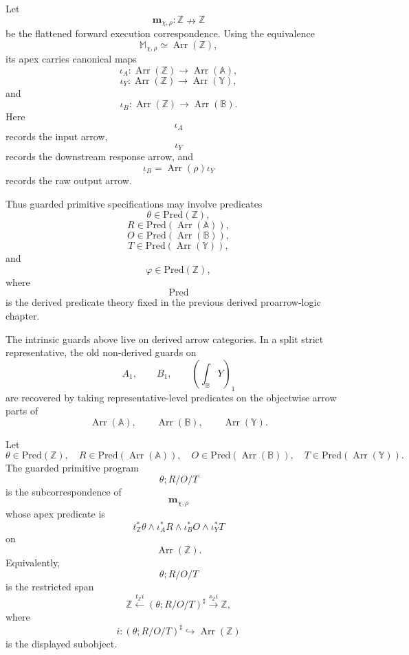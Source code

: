 Let
\[
\mathbf m_{\chi,\rho}:\mathbb Z\nrightarrow\mathbb Z
\]
be the flattened forward execution correspondence.  Using the equivalence
\[
\mathbb M_{\chi,\rho}
\simeq
\operatorname{Arr}(\mathbb Z),
\]
its apex carries canonical maps
\[
\iota_A:
\operatorname{Arr}(\mathbb Z)\to\operatorname{Arr}(\mathbb A),
\]
\[
\iota_Y:
\operatorname{Arr}(\mathbb Z)\to\operatorname{Arr}(\mathbb Y),
\]
and
\[
\iota_B:
\operatorname{Arr}(\mathbb Z)\to\operatorname{Arr}(\mathbb B).
\]
Here
\[
\iota_A
\]
records the input arrow,
\[
\iota_Y
\]
records the downstream response arrow, and
\[
\iota_B
=
\operatorname{Arr}(\rho)\iota_Y
\]
records the raw output arrow.

Thus guarded primitive specifications may involve predicates
\[
\theta\in\mathrm{Pred}(\mathbb Z),
\]
\[
R\in\mathrm{Pred}(\operatorname{Arr}(\mathbb A)),
\]
\[
O\in\mathrm{Pred}(\operatorname{Arr}(\mathbb B)),
\]
\[
T\in\mathrm{Pred}(\operatorname{Arr}(\mathbb Y)),
\]
and
\[
\varphi\in\mathrm{Pred}(\mathbb Z),
\]
where
\[
\mathrm{Pred}
\]
is the derived predicate theory fixed in the previous derived proarrow-logic
chapter.

\begin{remark}
\label{rem:derived-poly-strict-guard-predicates}
The intrinsic guards above live on derived arrow categories.  In a split strict
representative, the old non-derived guards on
\[
A_1,
\qquad
B_1,
\qquad
(\int_{\mathbb B}Y)_1
\]
are recovered by taking representative-level predicates on the objectwise
arrow parts of
\[
\operatorname{Arr}(\mathbb A),
\qquad
\operatorname{Arr}(\mathbb B),
\qquad
\operatorname{Arr}(\mathbb Y).
\]
\end{remark}

\begin{definition}
\label{def:derived-poly-guarded-primitive}
Let
\[
\theta\in\mathrm{Pred}(\mathbb Z),
\quad
R\in\mathrm{Pred}(\operatorname{Arr}(\mathbb A)),
\quad
O\in\mathrm{Pred}(\operatorname{Arr}(\mathbb B)),
\quad
T\in\mathrm{Pred}(\operatorname{Arr}(\mathbb Y)).
\]
The guarded primitive program
\[
\theta;R/O/T
\]
is the subcorrespondence of
\[
\mathbf m_{\chi,\rho}
\]
whose apex predicate is
\[
t_{\mathbb Z}^{\ast}\theta
\wedge
\iota_A^\ast R
\wedge
\iota_B^\ast O
\wedge
\iota_Y^\ast T
\]
on
\[
\operatorname{Arr}(\mathbb Z).
\]
Equivalently,
\[
\theta;R/O/T
\]
is the restricted span
\[
\mathbb Z
\xleftarrow{t_{\mathbb Z}i}
(\theta;R/O/T)^\sharp
\xrightarrow{s_{\mathbb Z}i}
\mathbb Z,
\]
where
\[
i:(\theta;R/O/T)^\sharp\hookrightarrow\operatorname{Arr}(\mathbb Z)
\]
is the displayed subobject.
\end{definition}

